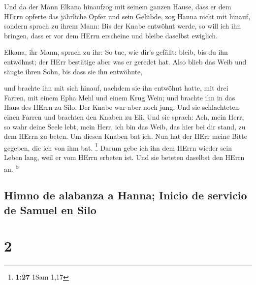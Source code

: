  Und da der Mann Elkana hinaufzog mit seinem ganzen
Hause, dass er dem HErrn opferte das jährliche Opfer und sein Gelübde,
 zog Hanna nicht mit hinauf, sondern sprach zu ihrem
Mann: Bis der Knabe entwöhnt werde, so will ich ihn bringen, dass er vor
dem HErrn erscheine und bleibe daselbst ewiglich.

 Elkana, ihr Mann, sprach zu ihr: So tue, wie dir's
gefällt: bleib, bis du ihn entwöhnst; der HErr bestätige aber was er
geredet hat. Also blieb das Weib und säugte ihren Sohn, bis dass sie ihn
entwöhnte,

 und brachte ihn mit sich hinauf, nachdem sie ihn
entwöhnt hatte, mit drei Farren, mit einem Epha Mehl und einem Krug
Wein; und brachte ihn in das Haus des HErrn zu Silo. Der Knabe war aber
noch jung.  Und sie schlachteten einen Farren und
brachten den Knaben zu Eli.  Und sie sprach: Ach, mein
Herr, so wahr deine Seele lebt, mein Herr, ich bin das Weib, das hier
bei dir stand, zu dem HErrn zu beten.  Um diesen Knaben
bat ich. Nun hat der HErr meine Bitte gegeben, die ich von ihm bat.
\footnote{\textbf{1:27} 1Sam 1,17}  Darum gebe ich ihn
dem HErrn wieder sein Leben lang, weil er vom HErrn erbeten ist. Und sie
beteten daselbst den HErrn an. \textsuperscript{b}

\hypertarget{himno-de-alabanza-a-hanna-inicio-de-servicio-de-samuel-en-silo}{%
\subsection{Himno de alabanza a Hanna; Inicio de servicio de Samuel en
Silo}\label{himno-de-alabanza-a-hanna-inicio-de-servicio-de-samuel-en-silo}}

\hypertarget{section-1}{%
\section{2}\label{section-1}}

